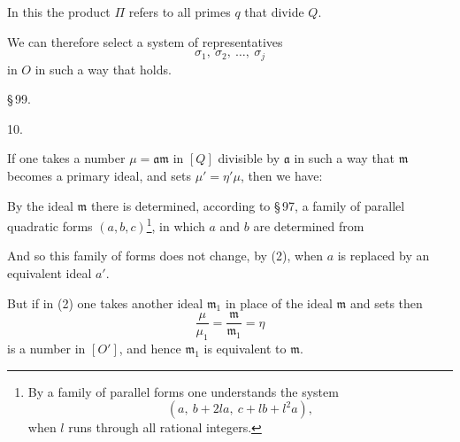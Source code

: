 
In this the product $\Pi$ refers to all primes $q$ that divide $Q$.

We can therefore select a system of representatives
\[
\sigma_1,\ \sigma_2,\ \dots,\ \sigma_j
\]
in $O$ in such a way that
holds.

\begin{center}
\S\,99. 
\end{center}

10. 

If one takes a number $\mu = \mathfrak{a}\mathfrak{m}$ in $[Q]$ divisible by $\mathfrak{a}$ in such a way that $\mathfrak{m}$ becomes a primary ideal, and sets $\mu' = \eta'\mu$, then we have:

By the ideal $\mathfrak{m}$ there is determined, according to \S\,97, a family of parallel quadratic forms $(a,b,c)$\footnote{By a family of parallel forms one understands the system \[ (a,\ b+2la,\ c+lb+l^2a), \] when $l$ runs through all rational integers.}, in which $a$ and $b$ are determined from %

And so this family of forms does not change, by (2), when $a$ is replaced by an equivalent ideal $a'$.

But if in (2) one takes another ideal $\mathfrak{m}_1$ in place of the ideal $\mathfrak{m}$ and sets
then
\[
\frac{\mu}{\mu_1} = \frac{\mathfrak{m}}{\mathfrak{m}_1} = \eta
\]
is a number in $[O']$, and hence $\mathfrak{m}_1$ is equivalent to $\mathfrak{m}$.
